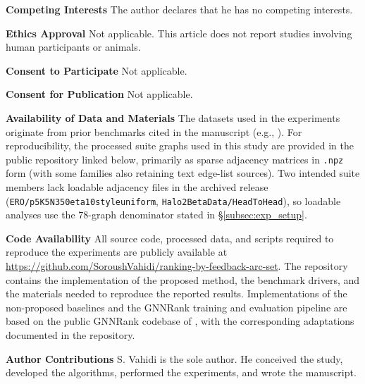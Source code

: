 \documentclass{article}
\begin{document}
\textbf{Competing Interests}
The author declares that he has no competing interests.

\textbf{Ethics Approval}
Not applicable. This article does not report studies involving human participants or animals.

\textbf{Consent to Participate}
Not applicable.

\textbf{Consent for Publication}
Not applicable.

\textbf{Availability of Data and Materials}
The datasets used in the experiments originate from prior benchmarks cited in the manuscript (e.g., \cite{he22}). For reproducibility, the processed suite graphs used in this study are provided in the public repository linked below, primarily as sparse adjacency matrices in \texttt{.npz} form (with some families also retaining text edge-list sources). Two intended suite members lack loadable adjacency files in the archived release (\texttt{ERO/p5K5N350eta10styleuniform}, \texttt{Halo2BetaData/HeadToHead}), so loadable analyses use the $78$-graph denominator stated in \S\ref{subsec:exp_setup}.

\textbf{Code Availability}
All source code, processed data, and scripts required to reproduce the experiments are publicly available at \url{https://github.com/SoroushVahidi/ranking-by-feedback-arc-set}. The repository contains the implementation of the proposed method, the benchmark drivers, and the materials needed to reproduce the reported results. Implementations of the non-proposed baselines and the GNNRank training and evaluation pipeline are based on the public GNNRank codebase of \citet{he22}, with the corresponding adaptations documented in the repository.


\textbf{Author Contributions}
S. Vahidi is the sole author. He conceived the study, developed the algorithms, performed the experiments, and wrote the manuscript.




\end{document}
